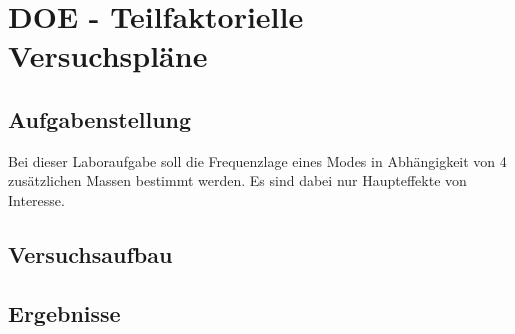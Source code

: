 \chapter{DOE - Teilfaktorielle Versuchspläne}
\label{sec: Hauptkapitel 1}

\section{Aufgabenstellung}
    Bei dieser Laboraufgabe soll die Frequenzlage eines Modes in Abhängigkeit von
    4 zusätzlichen Massen bestimmt werden. Es sind dabei nur Haupteffekte von
    Interesse.

\section{Versuchsaufbau}

\section{Ergebnisse}